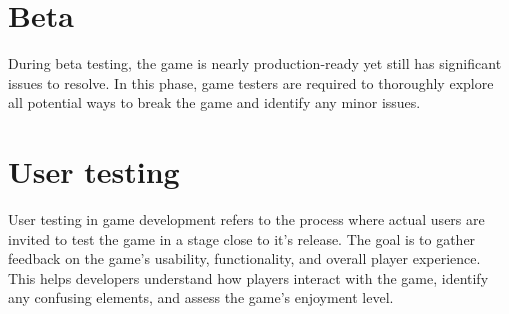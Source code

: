\documentclass{article}
\begin{document}
\section{Beta}
During beta testing, the game is nearly production-ready yet still has significant issues to resolve. In this phase, game testers are required to thoroughly explore all potential ways to break the game and identify any minor issues.

\section{User testing}
User testing in game development refers to the process where actual users are invited to test the game in a stage close to it's release. The goal is to gather feedback on  the game's usability, functionality, and overall player experience. This helps developers understand how players interact with the game, identify any confusing elements, and assess the game's enjoyment level.
\end{document}
